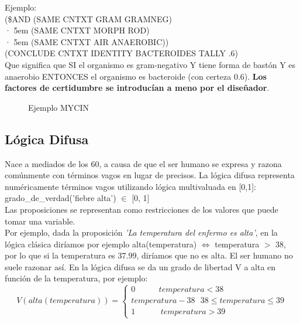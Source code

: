 \documentclass[12pt]{article}
\begin{document}
Ejemplo:\\
(\$AND \qquad (SAME CNTXT GRAM GRAMNEG)\\
· \kern 5em (SAME CNTXT MORPH ROD)\\
· \kern 5em (SAME CNTXT AIR ANAEROBIC))\\
(CONCLUDE CNTXT IDENTITY BACTEROIDES TALLY .6)\\

Que significa que SI el organismo es gram-negativo Y tiene forma de bastón Y es anaerobio ENTONCES el organismo es bacteroide (con certeza 0.6). \textbf{Los factores de certidumbre se introducían a meno por el diseñador}.

\begin{figure}[H]
 \centering
 \caption{Ejemplo MYCIN}
 \label{f:mycin}
\end{figure}

\subsection{Lógica Difusa}
Nace a mediados de los 60, a causa de que el ser humano se expresa y razona comúnmente con términos vagos en lugar de precisos. La lógica difusa representa numéricamente términos vagos utilizando lógica multivaluada en [0,1]:\\
grado\_de\_verdad('fiebre alta') $\in$ [0,	1]\\
Las proposiciones se representan como restricciones de los valores que puede tomar una variable.\\

Por ejemplo, dada la proposición \textit{'La temperatura del enfermo es alta'}, en la lógica clásica diríamos por ejemplo alta(temperatura) $\Leftrightarrow$ temperatura $>$ 38, por lo que si la temperatura es $37.99$, diríamos que no es alta. El ser humano no suele razonar así. En la lógica difusa se da un grado de libertad V a alta en función de la temperatura, por ejemplo:
\begin{equation}
V(alta(temperatura)) =   
  \left\lbrace
  \begin{array}{l}
     0 \ \ \ \ \ \ \ \ \ \ \ \ \ temperatura < 38 \\
     temperatura-38 \ \ \ 38 \leq temperatura \leq 39 \\
     1 \ \ \ \ \ \ \ \ \ \ \ \ \ \ temperatura > 39
  \end{array}
  \right.
\end{equation}
\end{document}
